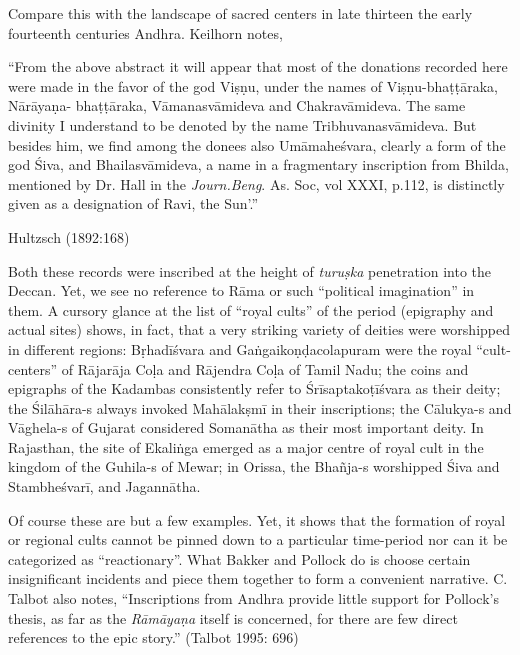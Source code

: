 Compare this with the landscape of sacred centers in late thirteen the early fourteenth centuries Andhra. Keilhorn notes, 

\begin{myquote}
“From the above abstract it will appear that most of the donations recorded here were made in the favor of the god Viṣṇu, under the names of Viṣṇu-bhaṭṭāraka, Nārāyaṇa- bhaṭṭāraka, Vāmanasvāmideva and Chakravāmideva. The same divinity I understand to be denoted by the name Tribhuvanasvāmideva. But besides him, we find among the donees also Umāmaheśvara, clearly a form of the god Śiva, and Bhailasvāmideva, a name in a fragmentary inscription from Bhilda, mentioned by Dr. Hall in the {\sl Journ.Beng}. As. Soc, vol XXXI, p.112, is distinctly given as a designation of Ravi, the Sun’.”

\hfill Hultzsch  (1892:168)
\end{myquote}

Both these records were inscribed at the height of {\sl turuṣka} penetration into the Deccan. Yet, we see no reference to Rāma or such “political imagination” in them. A cursory glance at the list of “royal cults” of the period (epigraphy and actual sites) shows, in fact, that a very striking variety of deities were worshipped in different regions: Bṛhadīśvara and Gaṅgaikoṇḍacolapuram were the royal “cult-centers” of Rājarāja Coḷa and Rājendra Coḷa of Tamil Nadu; the coins and epigraphs of the Kadambas consistently refer to Śrīsaptakoṭīśvara as their deity; the Śilāhāra-s always invoked Mahālakṣmī in their inscriptions; the Cālukya-s and Vāghela-s of Gujarat considered Somanātha as their most important deity. In Rajasthan, the site of Ekaliṅga emerged as a major centre of royal cult in the kingdom of the Guhila-s of Mewar; in Orissa, the Bhañja-s worshipped Śiva and Stambheśvarī, and Jagannātha.

Of course these are but a few examples. Yet, it shows that the formation of royal or regional cults cannot be pinned down to a particular time-period nor can it be categorized as “reactionary”.  What Bakker and Pollock do is choose certain insignificant incidents and piece them together to form a convenient narrative. C. Talbot also notes, “Inscriptions from Andhra provide little support for Pollock’s thesis, as far as the {\sl Rāmāyaṇa} itself is concerned, for there are few direct references to the epic story.” (Talbot 1995: 696) 


